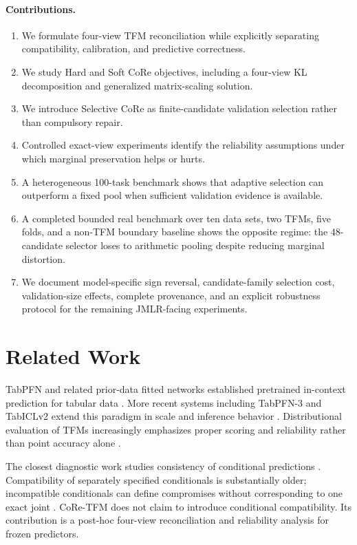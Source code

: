 \documentclass[twoside,11pt]{article}
\begin{document}
\paragraph{Contributions.}
\begin{enumerate}
\item We formulate four-view TFM reconciliation while explicitly separating compatibility, calibration, and predictive correctness.
\item We study Hard and Soft CoRe objectives, including a four-view KL decomposition and generalized matrix-scaling solution.
\item We introduce Selective CoRe as finite-candidate validation selection rather than compulsory repair.
\item Controlled exact-view experiments identify the reliability assumptions under which marginal preservation helps or hurts.
\item A heterogeneous 100-task benchmark shows that adaptive selection can outperform a fixed pool when sufficient validation evidence is available.
\item A completed bounded real benchmark over ten data sets, two TFMs, five folds, and a non-TFM boundary baseline shows the opposite regime: the 48-candidate selector loses to arithmetic pooling despite reducing marginal distortion.
\item We document model-specific sign reversal, candidate-family selection cost, validation-size effects, complete provenance, and an explicit robustness protocol for the remaining JMLR-facing experiments.
\end{enumerate}

\section{Related Work}
TabPFN and related prior-data fitted networks established pretrained in-context prediction for tabular data \citep{hollmann2025tabpfn}. More recent systems including TabPFN-3 and TabICLv2 extend this paradigm in scale and inference behavior \citep{grinsztajn2026tabpfn3,qu2026tabiclv2}. Distributional evaluation of TFMs increasingly emphasizes proper scoring and reliability rather than point accuracy alone \citep{landsgesell2026scoringbench,izbicki2026cde,johnson2026uq}.

The closest diagnostic work studies consistency of conditional predictions \citep{klotergens2026agree}. Compatibility of separately specified conditionals is substantially older; incompatible conditionals can define compromises without corresponding to one exact joint \citep{mure2017compromise}. CoRe-TFM does not claim to introduce conditional compatibility. Its contribution is a post-hoc four-view reconciliation and reliability analysis for frozen predictors.
\end{document}

